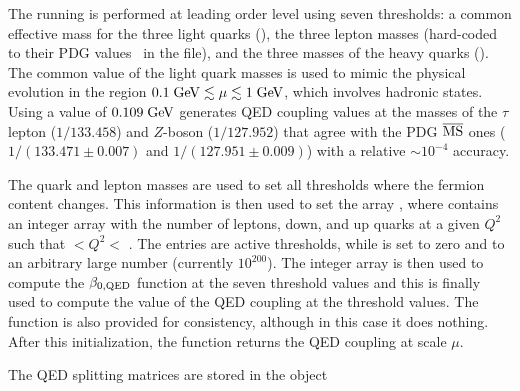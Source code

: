 The running is performed at leading order level using seven
thresholds: a common effective mass for the three light quarks
(), the three lepton masses (hard-coded to their
PDG values~\cite{ParticleDataGroup:2022pth} in the
 file), and the three masses of the heavy
quarks ().
%
The common value of the light quark masses is used to mimic the
physical evolution in the region $0.1\;\mathrm{GeV} \lesssim \mu \lesssim
1\;\mathrm{GeV}$, which involves hadronic states.
%
Using a value of $0.109\;\mathrm{GeV}$ generates QED coupling values at
the masses of the $\tau$ lepton ($1/133.458$) and $Z$-boson ($1/127.952$) that
agree with the PDG $\overline{\mathrm{MS}}$  ones ($1/(133.471\pm0.007)$ and $1/(127.951\pm0.009)$)
with a relative $\sim 10^{-4}$ accuracy.
% 
%

The quark and lepton masses are used to set all thresholds where the
fermion content changes. This information is then used to set
the array , where 
contains an integer array with the number of leptons, down, and up
quarks at a given $Q^2$ such that $<Q^2<$
.
%
The  entries are active thresholds, while
 is set to zero and  to an
arbitrary large number (currently $10^{200}$).
%
The integer array
 is then used to compute the
$\beta_{0,\rm QED}$ function  at the
seven threshold values and this is finally used to compute the value
of the QED coupling  at the
threshold values.
%
The function  is also provided for
consistency, although in this case it does nothing.
%
After this initialization, the function  returns the QED coupling at
scale $\mu$.


The QED splitting matrices are stored in the object

